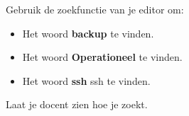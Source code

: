 Gebruik de zoekfunctie van je editor om:

\begin{itemize}
\item Het woord \textbf{backup} te vinden.
\item Het woord \textbf{Operationeel} te vinden.
\item Het woord \textbf{ssh} ssh te vinden.
\end{itemize}

Laat je docent zien hoe je zoekt.


